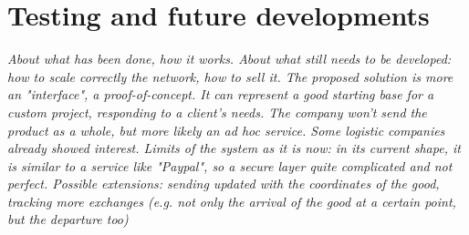 \chapter{Testing and future developments}
\label{cha:future}

\textit{About what has been done, how it works. About what still needs to be developed: how to scale correctly the network, how to sell it. The proposed solution is more an "interface", a proof-of-concept. It can represent a good starting base for a custom project, responding to a client's needs. The company won't send the product as a whole, but more likely an ad hoc service. Some logistic companies already showed interest. Limits of the system as it is now: in its current shape, it is similar to a service like "Paypal", so a secure layer quite complicated and not perfect. Possible extensions: sending updated with the coordinates of the good, tracking more exchanges (e.g. not only the arrival of the good at a certain point, but the departure too)}

